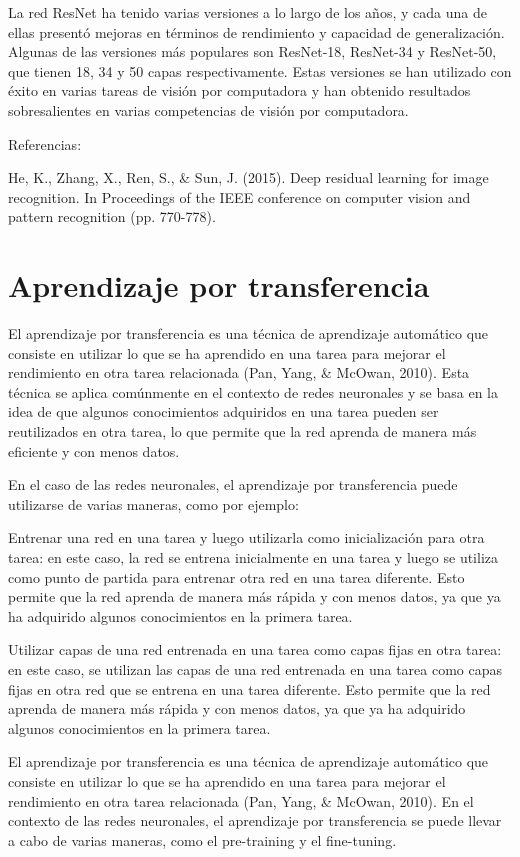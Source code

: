 La red ResNet ha tenido varias versiones a lo largo de los años, y cada una de ellas presentó mejoras en términos de
rendimiento y capacidad de generalización. Algunas de las versiones más populares son ResNet-18, ResNet-34 y ResNet-50,
que tienen 18, 34 y 50 capas respectivamente. Estas versiones se han utilizado con éxito en varias tareas de visión por
computadora y han obtenido resultados sobresalientes en varias competencias de visión por computadora.

Referencias:

He, K., Zhang, X., Ren, S., \& Sun, J. (2015). Deep residual learning for image recognition. In Proceedings of the IEEE
conference on computer vision and pattern recognition (pp. 770-778).

\section{Aprendizaje por transferencia}
El aprendizaje por transferencia es una técnica de aprendizaje automático que consiste en utilizar lo que se ha
aprendido en una tarea para mejorar el rendimiento en otra tarea relacionada (Pan, Yang, \& McOwan, 2010). Esta técnica
se aplica comúnmente en el contexto de redes neuronales y se basa en la idea de que algunos conocimientos adquiridos en
una tarea pueden ser reutilizados en otra tarea, lo que permite que la red aprenda de manera más eficiente y con menos
datos.

En el caso de las redes neuronales, el aprendizaje por transferencia puede utilizarse de varias maneras, como por
ejemplo:

Entrenar una red en una tarea y luego utilizarla como inicialización para otra tarea: en este caso, la red se entrena
inicialmente en una tarea y luego se utiliza como punto de partida para entrenar otra red en una tarea diferente. Esto
permite que la red aprenda de manera más rápida y con menos datos, ya que ya ha adquirido algunos conocimientos en la
primera tarea.

Utilizar capas de una red entrenada en una tarea como capas fijas en otra tarea: en este caso, se utilizan las capas de
una red entrenada en una tarea como capas fijas en otra red que se entrena en una tarea diferente. Esto permite que la
red aprenda de manera más rápida y con menos datos, ya que ya ha adquirido algunos conocimientos en la primera tarea.


El aprendizaje por transferencia es una técnica de aprendizaje automático que consiste en utilizar lo que se ha
aprendido en una tarea para mejorar el rendimiento en otra tarea relacionada (Pan, Yang, \& McOwan, 2010). En el
contexto de las redes neuronales, el aprendizaje por transferencia se puede llevar a cabo de varias maneras, como el
pre-training y el fine-tuning.


